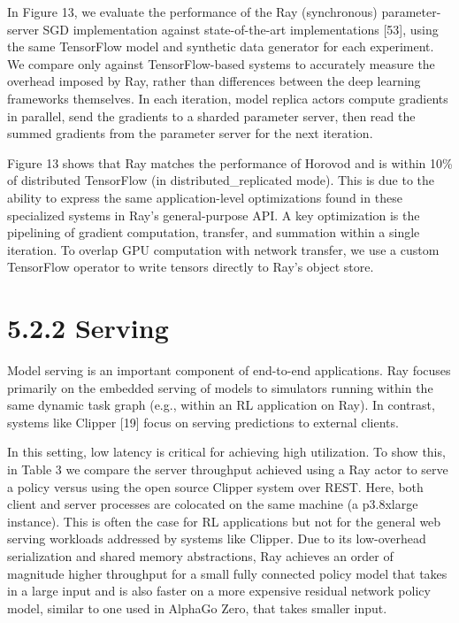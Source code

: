 \documentclass[
]{article}
\begin{document}
In Figure 13, we evaluate the performance of the Ray (synchronous)
parameter-server SGD implementation against state-of-the-art
implementations {[}53{]}, using the same TensorFlow model and synthetic
data generator for each experiment. We compare only against
TensorFlow-based systems to accurately measure the overhead imposed by
Ray, rather than differences between the deep learning frameworks
themselves. In each iteration, model replica actors compute gradients in
parallel, send the gradients to a sharded parameter server, then read
the summed gradients from the parameter server for the next iteration.

Figure 13 shows that Ray matches the performance of Horovod and is
within 10\% of distributed TensorFlow (in distributed\_replicated mode).
This is due to the ability to express the same application-level
optimizations found in these specialized systems in Ray's
general-purpose API. A key optimization is the pipelining of gradient
computation, transfer, and summation within a single iteration. To
overlap GPU computation with network transfer, we use a custom
TensorFlow operator to write tensors directly to Ray's object store.

\section{5.2.2 Serving}\label{serving}

Model serving is an important component of end-to-end applications. Ray
focuses primarily on the embedded serving of models to simulators
running within the same dynamic task graph (e.g., within an RL
application on Ray). In contrast, systems like Clipper {[}19{]} focus on
serving predictions to external clients.

In this setting, low latency is critical for achieving high utilization.
To show this, in Table 3 we compare the server throughput achieved using
a Ray actor to serve a policy versus using the open source Clipper
system over REST. Here, both client and server processes are colocated
on the same machine (a p3.8xlarge instance). This is often the case for
RL applications but not for the general web serving workloads addressed
by systems like Clipper. Due to its low-overhead serialization and
shared memory abstractions, Ray achieves an order of magnitude higher
throughput for a small fully connected policy model that takes in a
large input and is also faster on a more expensive residual network
policy model, similar to one used in AlphaGo Zero, that takes smaller
input.
\end{document}
